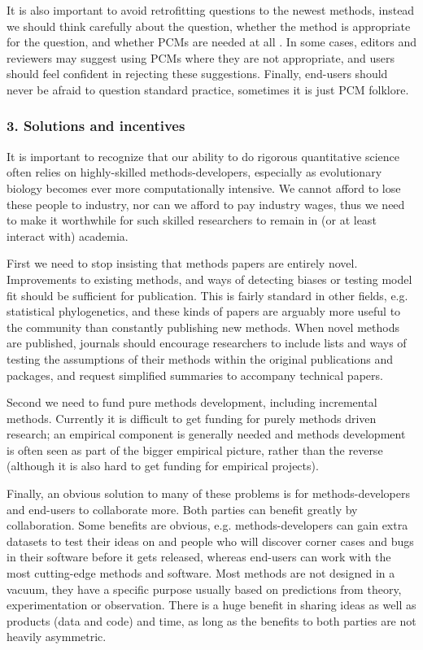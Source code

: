 \documentclass[a4paper,12pt]{article}
\begin{document}
    It is also important to avoid retrofitting questions to the newest methods, instead we should think carefully about the question, whether the method is appropriate for the question, and whether PCMs are needed at all \citep{westoby1995misinterpreting,losos2011seeing}.
    In some cases, editors and reviewers may suggest using PCMs where they are not appropriate, and users should feel confident in rejecting these suggestions.
    Finally, end-users should never be afraid to question standard practice, sometimes it is just PCM folklore.

  \subsubsection{3. Solutions and incentives}
    It is important to recognize that our ability to do rigorous quantitative science often relies on highly-skilled methods-developers, especially as evolutionary biology becomes ever more computationally intensive. 
    We cannot afford to lose these people to industry, nor can we afford to pay industry wages, thus we need to make it worthwhile for such skilled researchers to remain in (or at least interact with) academia.

    First we need to stop insisting that methods papers are entirely novel. 
    Improvements to existing methods, and ways of detecting biases or testing model fit should be sufficient for publication.
    This is fairly standard in other fields, e.g. statistical phylogenetics, and these kinds of papers are arguably more useful to the community than constantly publishing new methods.
    When novel methods are published, journals should encourage researchers to include lists and ways of testing the assumptions of their methods within the original publications and packages, and request simplified summaries to accompany technical papers.

    Second we need to fund pure methods development, including incremental methods. 
    Currently it is difficult to get funding for purely methods driven research; an empirical component is generally needed and methods development is often seen as part of the bigger empirical picture, rather than the reverse (although it is also hard to get funding for empirical projects). 

    Finally, an obvious solution to many of these problems is for methods-developers and end-users to collaborate more. 
    Both parties can benefit greatly by collaboration. 
    Some benefits are obvious, e.g. methods-developers can gain extra datasets to test their ideas on and people who will discover corner cases and bugs in their software before it gets released, whereas end-users can work with the most cutting-edge methods and software.  
    Most methods are not designed in a vacuum, they have a specific purpose usually based on predictions from theory, experimentation or observation.
    There is a huge benefit in sharing ideas as well as products (data and code) and time, as long as the benefits to both parties are not heavily asymmetric. 
\end{document}
